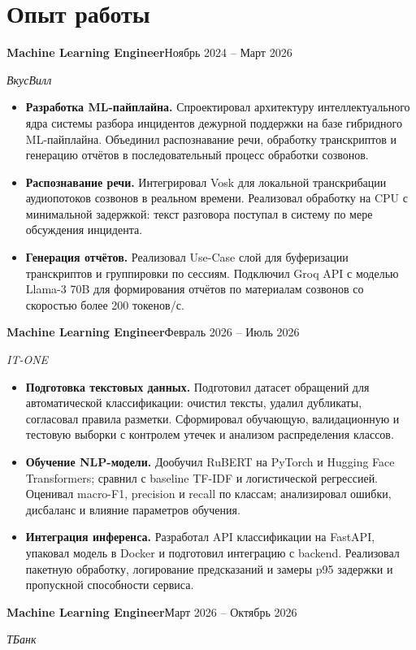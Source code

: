 \documentclass[a4paper,11pt]{article}
\newcommand{\entry}[3]{\textbf{#1}\hfill #3\par\textit{#2}\par}
\begin{document}
\section*{Опыт работы}
\entry{Machine Learning Engineer}{ВкусВилл}{Ноябрь 2024 -- Март 2026}
\begin{itemize}
\item \textbf{Разработка ML-пайплайна.} Спроектировал архитектуру интеллектуального ядра системы разбора инцидентов дежурной поддержки на базе гибридного ML-пайплайна. Объединил распознавание речи, обработку транскриптов и генерацию отчётов в последовательный процесс обработки созвонов.
\item \textbf{Распознавание речи.} Интегрировал Vosk для локальной транскрибации аудиопотоков созвонов в реальном времени. Реализовал обработку на CPU с минимальной задержкой: текст разговора поступал в систему по мере обсуждения инцидента.
\item \textbf{Генерация отчётов.} Реализовал Use-Case слой для буферизации транскриптов и группировки по сессиям. Подключил Groq API с моделью Llama-3 70B для формирования отчётов по материалам созвонов со скоростью более 200 токенов/с.
\end{itemize}
\vspace{4pt}
\entry{Machine Learning Engineer}{IT-ONE}{Февраль 2026 -- Июль 2026}
\begin{itemize}
\item \textbf{Подготовка текстовых данных.} Подготовил датасет обращений для автоматической классификации: очистил тексты, удалил дубликаты, согласовал правила разметки. Сформировал обучающую, валидационную и тестовую выборки с контролем утечек и анализом распределения классов.
\item \textbf{Обучение NLP-модели.} Дообучил RuBERT на PyTorch и Hugging Face Transformers; сравнил с baseline TF-IDF и логистической регрессией. Оценивал macro-F1, precision и recall по классам; анализировал ошибки, дисбаланс и влияние параметров обучения.
\item \textbf{Интеграция инференса.} Разработал API классификации на FastAPI, упаковал модель в Docker и подготовил интеграцию с backend. Реализовал пакетную обработку, логирование предсказаний и замеры p95 задержки и пропускной способности сервиса.
\end{itemize}
\vspace{4pt}
\entry{Machine Learning Engineer}{ТБанк}{Март 2026 -- Октябрь 2026}
\end{document}
